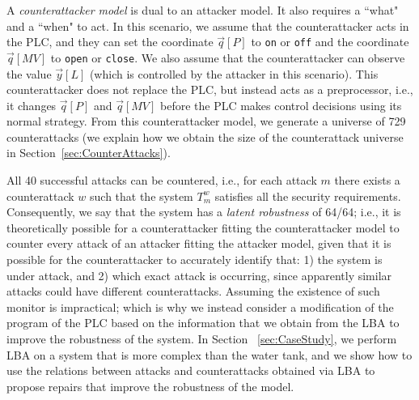 A \emph{counterattacker model} is dual to an attacker model. It also requires a ``what" and a ``when" to act. In this scenario, we assume that the counterattacker acts in the PLC, and they can set the coordinate $\vec{q}[P]$ to \texttt{on} or \texttt{off} and the coordinate $\vec{q}[MV]$ to \texttt{open} or \texttt{close}. We also assume that the counterattacker can observe the value $\vec{y}[L]$ (which is controlled by the attacker in this scenario). This counterattacker does not replace the PLC, but instead acts as a preprocessor, i.e., it changes $\vec{q}[P]$ and $\vec{q}[MV]$ before the PLC makes control decisions using its normal strategy. From this counterattacker model, we generate a universe of 729 counterattacks (we explain how we obtain the size of the counterattack universe in Section~\ref{sec:CounterAttacks}). 

All 40 successful attacks can be countered, i.e., for each attack $m$ there exists a counterattack $w$ such that the system $T^w_m$ satisfies all the security requirements. Consequently, we say that the system has a \emph{latent robustness} of 64/64; i.e., it is theoretically possible for a counterattacker fitting the counterattacker model to counter every attack of an attacker fitting the attacker model, given that it is possible for the counterattacker to accurately identify that: 1) the system is under attack, and 2) which exact attack is occurring, since apparently similar attacks could have different counterattacks. Assuming the existence of such monitor is impractical; which is why we instead consider a modification of the program of the PLC based on the information that we obtain from the LBA to improve the robustness of the system. In Section ~\ref{sec:CaseStudy}, we perform LBA on a system that is more complex than the water tank, and we show how to use the relations between attacks and counterattacks obtained via LBA to propose repairs that improve the robustness of the model.  

